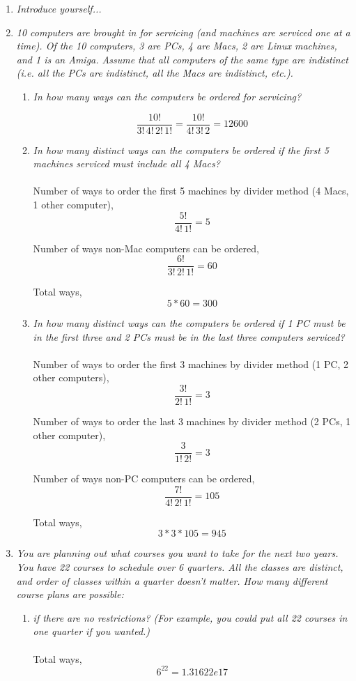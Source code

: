 \documentclass{article} %
\begin{document}
\thispagestyle{fancy} %

\begin{enumerate}
	\item \textit{Introduce yourself...}
	
	\item \textit{10 computers are brought in for servicing (and machines are serviced one at a time). Of the 10 computers, 3 are PCs, 4 are Macs, 2 are Linux machines, and 1 is an Amiga. Assume that all computers of the same type are indistinct (i.e. all the PCs are indistinct, all the Macs are indistinct, etc.).}
	\begin{enumerate}
		\item \textit{In how many ways can the computers be ordered for servicing?}
		
		$$\frac{10!}{3!\,4!\,2!\,1!} = \frac{10!}{4!\,3!\,2} = 12600$$
		
		\item \textit{In how many distinct ways can the computers be ordered if the first 5 machines serviced must include all 4 Macs?}\\
		\\
		Number of ways to order the first 5 machines by divider method (4 Macs, 1 other computer), $$\frac{5!}{4!\,1!} = 5$$
		
		Number of ways non-Mac computers can be ordered, $$\frac{6!}{3!\,2!\,1!} = 60$$
		
		Total ways, $$5*60 = 300$$
		
		\item \textit{In how many distinct ways can the computers be ordered if 1 PC must be in the first three and 2 PCs must be in the last three computers serviced?}\\
		\\
		Number of ways to order the first 3 machines by divider method (1 PC, 2 other computers), $$\frac{3!}{2!\,1!} = 3$$
		
		Number of ways to order the last 3 machines by divider method (2 PCs, 1 other computer), $$\frac{3}{1!\,2!} = 3$$
		
		Number of ways non-PC computers can be ordered, $$\frac{7!}{4!\,2!\,1!} = 105$$
		
		Total ways, $$3*3*105 = 945$$
		
	\end{enumerate}
	
	\item \textit{You are planning out what courses you want to take for the next two years. You have 22 courses to schedule over 6 quarters. All the classes are distinct, and order of classes within a quarter doesn't matter. How many different course plans are possible:}
	\begin{enumerate}
		\item \textit{if there are no restrictions? (For example, you could put all 22 courses in one quarter if you wanted.)}\\
		\\
		Total ways, $$6^{22} = 1.31622e17$$
		

\end{enumerate}
\end{enumerate}
\end{document}
